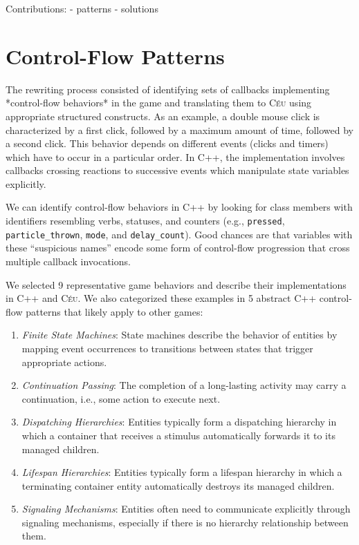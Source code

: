 \documentclass{vgtc}                          %
\newcommand{\CEU}{\textsc{C\'{e}u}\xspace}
\newcommand{\code}[1] {{\small{\texttt{#1}}}}
\begin{document}
Contributions:
    - patterns
    - solutions

\section{Control-Flow Patterns}

The rewriting process consisted of identifying sets of callbacks implementing
*control-flow behaviors* in the game and translating them to \CEU using
appropriate structured constructs.
As an example, a double mouse click is characterized by a first click, followed
by a maximum amount of time, followed by a second click.
This behavior depends on different events (clicks and timers) which have to
occur in a particular order.
In C++, the implementation involves callbacks crossing reactions to successive
events which manipulate state variables explicitly.

We can identify control-flow behaviors in C++ by looking for class members with
identifiers resembling verbs, statuses, and counters (e.g.,
\code{pressed},
\code{particle\_thrown},
\code{mode}, and
\code{delay\_count}).
Good chances are that variables with these ``suspicious names'' encode some
form of control-flow progression that cross multiple callback invocations.

We selected 9 representative game behaviors and describe their
implementations in C++ and \CEU.
We also categorized these examples in 5 abstract C++ control-flow patterns that
likely apply to other games:

\begin{enumerate}
\item \emph{Finite State Machines}:
    State machines describe the behavior of entities by mapping event
    occurrences to transitions between states that trigger appropriate actions.
\item \emph{Continuation Passing}:
    The completion of a long-lasting activity may carry a continuation, i.e.,
    some action to execute next.
\item \emph{Dispatching Hierarchies}:
    Entities typically form a dispatching hierarchy in which a container that
    receives a stimulus automatically forwards it to its managed children.
\item \emph{Lifespan Hierarchies}:
    Entities typically form a lifespan hierarchy in which a terminating
    container entity automatically destroys its managed children.
\item \emph{Signaling Mechanisms}:
    Entities often need to communicate explicitly through signaling mechanisms,
    especially if there is no hierarchy relationship between them.
\end{enumerate}
\end{document}

